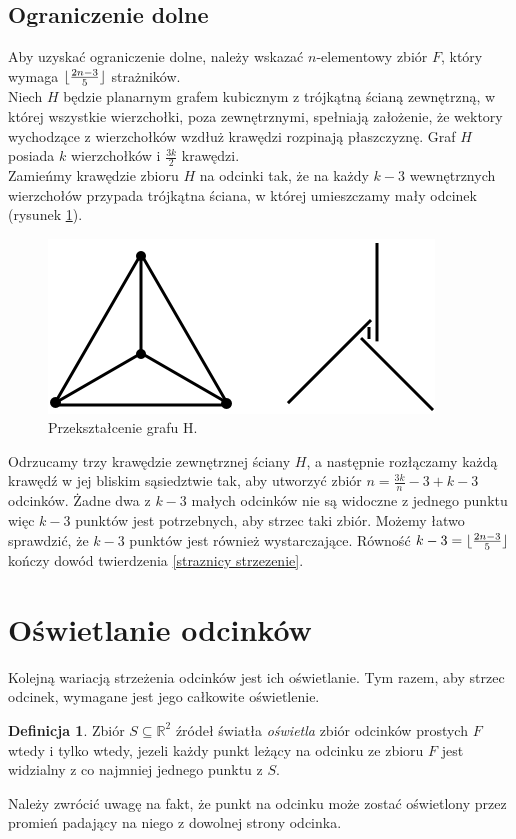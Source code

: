 \documentclass[brudnopis]{xmgr}
\DeclarePairedDelimiter\floor{\lfloor}{\rfloor}
\theoremstyle{definition}
\newtheorem{Definicja}{Definicja}
\begin{document}
\subsection{Ograniczenie dolne}
\indent Aby uzyskać ograniczenie dolne, należy wskazać $n$-elementowy zbiór $F$, który wymaga $\floor{\frac{2n-3}{5}}$ strażników.
\\\indent Niech $H$ będzie planarnym grafem kubicznym z trójkątną ścianą zewnętrzną, w której wszystkie wierzchołki, poza zewnętrznymi, spełniają założenie, że wektory wychodzące z wierzchołków wzdłuż krawędzi rozpinają płaszczyznę. Graf $H$ posiada $k$ wierzchołków i $\frac{3k}{2}$ krawędzi.
\\\indent Zamieńmy krawędzie zbioru $H$ na odcinki tak, że na każdy $k - 3$ wewnętrznych wierzchołów przypada trójkątna ściana, w której umieszczamy mały odcinek (rysunek \ref{fig:przeksztalcenie h}).
\begin{figure}[ht!]
 \centering
  \includegraphics{rysunki/dolna_granica.png}
  \caption{Przekształcenie grafu H.}
  \label{fig:przeksztalcenie h}
\end{figure} 
Odrzucamy trzy krawędzie zewnętrznej ściany $H$, a następnie rozłączamy każdą krawędź w jej bliskim sąsiedztwie tak, aby utworzyć zbiór $n = \frac{3k}{n} - 3 + k  - 3$ odcinków. Żadne dwa z $k - 3$ małych odcinków nie są widoczne z jednego punktu więc $k - 3$ punktów jest potrzebnych, aby strzec taki zbiór. Możemy łatwo sprawdzić, że $k - 3$ punktów jest również wystarczające. Równość $k - 3 = \floor{\frac{2n - 3}{5}}$ kończy dowód twierdzenia \ref{straznicy strzezenie}.

\section{Oświetlanie odcinków}\label{oświetlanie odcinków}
Kolejną wariacją strzeżenia odcinków jest ich oświetlanie. Tym razem, aby strzec odcinek, wymagane jest jego całkowite oświetlenie.
\begin{Definicja}
	Zbiór $S \subseteq \mathbb{R}^2$ źródeł światła \emph{oświetla} zbiór odcinków prostych $F$ wtedy i tylko wtedy, jezeli każdy punkt leżący na odcinku ze zbioru $F$ jest widzialny z co najmniej jednego punktu z $S$.
\end{Definicja} Należy zwrócić uwagę na fakt, że punkt na odcinku może zostać oświetlony przez promień padający na niego z dowolnej strony odcinka.
\end{document}
